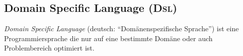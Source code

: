 \subsection{Domain Specific Language (\textsc{Dsl})}
\label{sec:dsl}

\emph{Domain Specific Language} (deutsch: \enquote{Domänenspezifische Sprache}) ist eine Programmiersprache die nur auf eine bestimmte Domäne oder auch Problembereich optimiert ist.